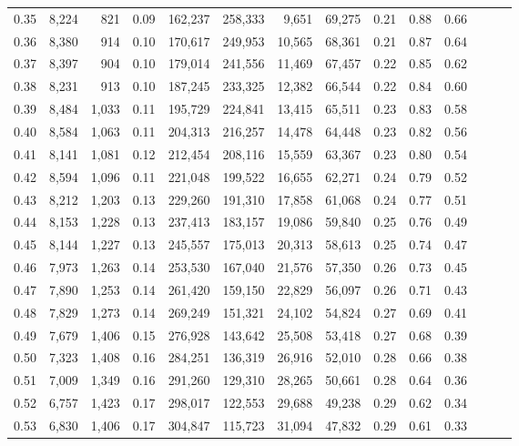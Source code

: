 \begin{tabular}{rrrrrrrrrrrrrr}
0.35 &  8,224 &    821 &  0.09 &  162,237 &  258,333 &   9,651 &  69,275 &  0.21 &  0.88 &      0.66 \\
0.36 &  8,380 &    914 &  0.10 &  170,617 &  249,953 &  10,565 &  68,361 &  0.21 &  0.87 &      0.64 \\
0.37 &  8,397 &    904 &  0.10 &  179,014 &  241,556 &  11,469 &  67,457 &  0.22 &  0.85 &      0.62 \\
0.38 &  8,231 &    913 &  0.10 &  187,245 &  233,325 &  12,382 &  66,544 &  0.22 &  0.84 &      0.60 \\
0.39 &  8,484 &  1,033 &  0.11 &  195,729 &  224,841 &  13,415 &  65,511 &  0.23 &  0.83 &      0.58 \\
0.40 &  8,584 &  1,063 &  0.11 &  204,313 &  216,257 &  14,478 &  64,448 &  0.23 &  0.82 &      0.56 \\
0.41 &  8,141 &  1,081 &  0.12 &  212,454 &  208,116 &  15,559 &  63,367 &  0.23 &  0.80 &      0.54 \\
0.42 &  8,594 &  1,096 &  0.11 &  221,048 &  199,522 &  16,655 &  62,271 &  0.24 &  0.79 &      0.52 \\
0.43 &  8,212 &  1,203 &  0.13 &  229,260 &  191,310 &  17,858 &  61,068 &  0.24 &  0.77 &      0.51 \\
0.44 &  8,153 &  1,228 &  0.13 &  237,413 &  183,157 &  19,086 &  59,840 &  0.25 &  0.76 &      0.49 \\
0.45 &  8,144 &  1,227 &  0.13 &  245,557 &  175,013 &  20,313 &  58,613 &  0.25 &  0.74 &      0.47 \\
0.46 &  7,973 &  1,263 &  0.14 &  253,530 &  167,040 &  21,576 &  57,350 &  0.26 &  0.73 &      0.45 \\
0.47 &  7,890 &  1,253 &  0.14 &  261,420 &  159,150 &  22,829 &  56,097 &  0.26 &  0.71 &      0.43 \\
0.48 &  7,829 &  1,273 &  0.14 &  269,249 &  151,321 &  24,102 &  54,824 &  0.27 &  0.69 &      0.41 \\
0.49 &  7,679 &  1,406 &  0.15 &  276,928 &  143,642 &  25,508 &  53,418 &  0.27 &  0.68 &      0.39 \\
0.50 &  7,323 &  1,408 &  0.16 &  284,251 &  136,319 &  26,916 &  52,010 &  0.28 &  0.66 &      0.38 \\
0.51 &  7,009 &  1,349 &  0.16 &  291,260 &  129,310 &  28,265 &  50,661 &  0.28 &  0.64 &      0.36 \\
0.52 &  6,757 &  1,423 &  0.17 &  298,017 &  122,553 &  29,688 &  49,238 &  0.29 &  0.62 &      0.34 \\
0.53 &  6,830 &  1,406 &  0.17 &  304,847 &  115,723 &  31,094 &  47,832 &  0.29 &  0.61 &      0.33 \\

\end{tabular}
